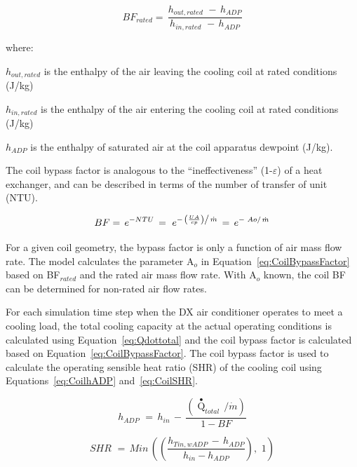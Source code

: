 \begin{equation}
B{F_{rated}} = \,\frac{{{h_{out,rated}}\,\, - \,{h_{ADP}}}}{{{h_{in,rated}}\,\, - \,{h_{ADP}}}}
\end{equation}

where:

\(h_{out,rated}\) is the enthalpy of the air leaving the cooling coil at rated conditions (J/kg)

\(h_{in,rated}\) is the enthalpy of the air entering the cooling coil at rated conditions (J/kg)

\(h_{ADP}\) is the enthalpy of saturated air at the coil apparatus dewpoint (J/kg).

The coil bypass factor is analogous to the ``ineffectiveness'' (1-\(\varepsilon\)) of a heat exchanger, and can be described in terms of the number of transfer of unit (NTU).

\begin{equation}
BF = \,{e^{ - NTU}}\, = \,\,{e^{ - \,{{\left( {\frac{{UA}}{{cp}}} \right)} \mathord{\left/ {\vphantom {{\left( {\frac{{UA}}{{cp}}} \right)} {\dot m}}} \right. } {\dot m}}}}\, = \,{e^{ - \,\,{{Ao} \mathord{\left/ {\vphantom {{Ao} {\dot m}}} \right. } {\dot m}}}}
\label{eq:CoilBypassFactor}
\end{equation}

For a given coil geometry, the bypass factor is only a function of air mass flow rate. The model calculates the parameter A\(_{o}\) in Equation~\ref{eq:CoilBypassFactor} based on BF\(_{rated}\) and the rated air mass flow rate. With A\(_{o}\) known, the coil BF can be determined for non-rated air flow rates.

For each simulation time step when the DX air conditioner operates to meet a cooling load, the total cooling capacity at the actual operating conditions is calculated using Equation~\ref{eq:Qdottotal} and the coil bypass factor is calculated based on Equation~\ref{eq:CoilBypassFactor}. The coil bypass factor is used to calculate the operating sensible heat ratio (SHR) of the cooling coil using Equations~\ref{eq:CoilhADP} and~\ref{eq:CoilSHR}.

\begin{equation}
{h_{ADP}}\,\, = \,{h_{in}}\, - \,\frac{{({{\mathop Q\limits^ \bullet  }_{total}}\,/\dot m)}}{{1 - BF}}
\label{eq:CoilhADP}
\end{equation}

\begin{equation}
SHR\,\, = \,Min\,\left( {\left( {\frac{{{h_{Tin,wADP}}\, - \,{h_{ADP}}}}{{{h_{in}} - {h_{ADP}}}}} \right),\,\,1} \right)
\label{eq:CoilSHR}
\end{equation}

